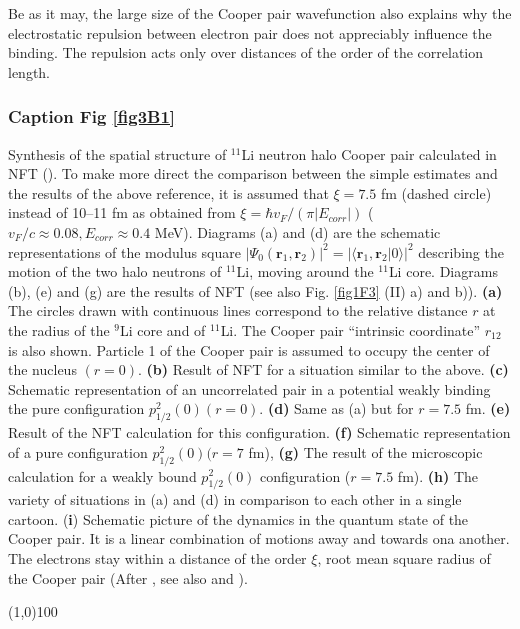 \begin{subappendices}
         
Be as it may, the large size of the Cooper pair wavefunction also explains why the electrostatic repulsion between electron pair does not appreciably influence the binding. The repulsion acts only over distances of the order of the correlation length. 

         \subsubsection{Caption Fig \ref{fig3B1}}
         Synthesis of the spatial structure of $^{11}$Li neutron halo Cooper pair calculated in NFT (\cite{Barranco:01}). To make more direct the comparison between the simple estimates and the results of the above reference, it is assumed that $\xi=7.5$ fm (dashed circle) instead of 10--11 fm as obtained from $\xi=\hbar v_F/(\pi |E_{corr}|)$ ($v_F/c\approx 0.08, E_{corr}\approx 0.4$ MeV). Diagrams (a) and (d) are the schematic representations of the modulus square $|\Psi_0(\mathbf r_1, \mathbf r_2)|^2=|\langle\mathbf r_1, \mathbf r_2|0\rangle|^2$ describing the motion of the two halo neutrons of $^{11}$Li, moving around the $^{11}$Li core. Diagrams (b), (e) and (g) are the results of NFT (see also Fig. \ref{fig1F3} (II) a) and b)). \textbf{(a)} The  circles drawn with continuous lines correspond to the relative distance $r$ at the radius of the $^{9}$Li core and of $^{11}$Li. The Cooper pair ``intrinsic coordinate'' $r_{12}$ is also shown. Particle 1 of the Cooper pair is assumed to occupy the center of the nucleus $(r=0)$. \textbf{(b)} Result of NFT for a situation similar to the above. \textbf{(c)} Schematic representation of an uncorrelated pair in a potential weakly binding the pure configuration $p^2_{1/2}(0) (r=0)$. \textbf{(d)} Same as (a) but for $r=7.5$ fm. \textbf{(e)} Result of the NFT calculation for this configuration. \textbf{(f)} Schematic representation of a pure configuration $p^2_{1/2}(0) (r=7$ fm), \textbf{(g)} The result of the microscopic calculation for a weakly bound $p^2_{1/2}(0)$ configuration ($r=7.5$ fm). \textbf{(h)} The variety of situations in (a) and (d) in comparison to each other in a single cartoon. (\textbf{i}) Schematic picture of the dynamics in the quantum state of the Cooper pair. It is a linear combination of motions away and towards ona another. The electrons stay within a distance of the order $\xi$, root mean square radius of the Cooper pair (After \cite{Weisskopf:81}, see also \cite{Kadin:07} and \cite{VanWitsen:14}).
\begin{center}
	\line(1,0){100}
\end{center}
         

\end{subappendices}
